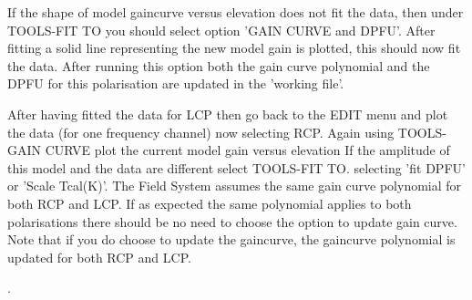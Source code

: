 \vskip 0.5cm
\vskip 0.5cm

    If the shape of 
    model gaincurve versus elevation does not fit  the data, then 
    under TOOLS-FIT TO you should select option 'GAIN CURVE and DPFU'.
    After fitting  a solid line representing the new 
    model gain is plotted, this should now fit the data. 
    After running this option both the gain curve polynomial and the 
    DPFU for this polarisation are updated in the 'working file'.


\vskip 0.5cm
\vskip 0.5cm

    After having fitted the data for LCP then go back to the  EDIT 
    menu and plot the data (for one frequency channel) now selecting  RCP.
    Again using TOOLS-GAIN CURVE plot the current model gain versus elevation
    If the amplitude of this model and the data are different select 
    TOOLS-FIT TO. selecting 'fit DPFU' or 'Scale Tcal(K)'. The Field
    System assumes the same gain curve polynomial for both RCP and LCP.
    If as expected the same polynomial applies to both polarisations
    there should be no need to choose the option to update  gain curve. 
    Note that if  you do choose to update the gaincurve, the gaincurve
    polynomial is updated for both RCP and LCP.  

\vskip 1cm

.

 
     









